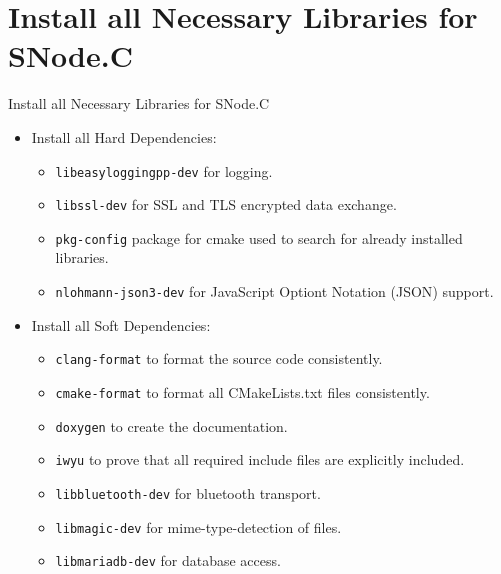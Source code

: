 \nosectionpage
\section{Install all Necessary Libraries for SNode.C}
\withsectionpage

\begin{frame}{Install all Necessary Libraries for SNode.C}
  \begin{itemize}
    \item Install all \alert{Hard Dependencies}:
    \begin{itemize}
      \item \texttt{\alert{libeasyloggingpp-dev}} for logging.
      \item \texttt{\alert{libssl-dev}} for SSL and TLS encrypted data exchange.
      \item \texttt{\alert{pkg-config}} package for cmake used to search for already installed libraries.
      \item \texttt{\alert{nlohmann-json3-dev}} for \alert{J}ava\alert{S}cript \alert{O}ptiont \alert{N}otation (\alert{JSON}) support.
    \end{itemize}
    \item Install all \alert{Soft Dependencies}:
    \begin{itemize}
      \item \texttt{\alert{clang-format}} to format the source code consistently.
      \item \texttt{\alert{cmake-format}} to format all CMakeLists.txt files consistently.
      \item \texttt{\alert{doxygen}} to create the documentation.
      \item \texttt{\alert{iwyu}} to prove that all required include files are explicitly included.
      \item \texttt{\alert{libbluetooth-dev}} for bluetooth transport.
      \item \texttt{\alert{libmagic-dev}} for mime-type-detection of files.
      \item \texttt{\alert{libmariadb-dev}} for database access.
    \end{itemize}
  \end{itemize}
\end{frame}
